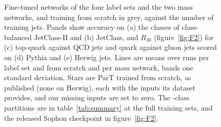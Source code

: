 \begin{figure}[t]
\centering
{}
\caption{ Fine-tuned
networks of the four label sets and the two mass networks, and training from scratch in grey, against
the number of training jets. Panels show accuracy on (a) the \Kfull{} classes of class-balanced JetClass-II and
(b) JetClass, and $R_{30}$ (figure~\ref{fig:F2}) for (c) top-quark against QCD jets and quark against gluon jets scored on (d)
Pythia and (e) Herwig jets. Lines are means over \MlstNRunsWord{} runs per label set and from scratch and
\MlstMassNRunsWord{} per mass network, bands one standard deviation. Stars are ParT trained from scratch, as
published (none on Herwig), each with the inputs its dataset provides, and our missing inputs are set to zero. The \Kcoarse-class partitions
are in table~\ref{tab:summary} at the full training sets, and the released Sophon checkpoint in figure~\ref{fig:F2}.}
\label{fig:A8}
\end{figure}
